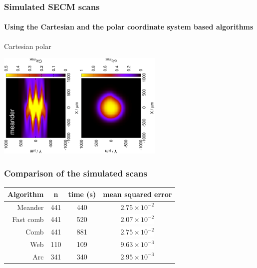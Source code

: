 \documentclass{beamer}
\begin{document}
\begin{frame}
	\frametitle{Simulated SECM scans}	
	\framesubtitle{Using the Cartesian and the polar coordinate system based algorithms}
	\centering
	\quad\quad\quad\quad\quad\quad Cartesian \hfill polar \quad\quad\quad\quad\quad\quad\quad\quad

	\includegraphics[width=0.3\textwidth, angle=-90]{meander_sim.eps}\includegraphics[width=0.3\textwidth, angle=-90]{arc_sim.eps}
	\vfill
\end{frame}


\begin{frame}
	\frametitle{Comparison of the simulated scans}

\begin{table}
		\label{table:comp}
		\centering
		\begin{tabular}{r c c c}
			Algorithm & n & time (s) & mean squared error \\
			\hline
			Meander & 441 & 440 & \textcolor{white!100}{\colorbox{red!100}{$2.75\times 10^{-2}$}} \\
			Fast comb& 441 & 520  & \colorbox{white}{$2.07\times 10^{-2}$} \\
			Comb & 441 & 881 & \colorbox{white}{$2.75\times 10^{-2}$} \\
			Web & 110 & 109 & \colorbox{white}{$9.63\times 10^{-3}$} \\
			Arc & 341 & 340 & \colorbox{green!100}{$2.95\times 10^{-3}$} \\
		\end{tabular}
\end{table}
\end{frame}
\end{document}
